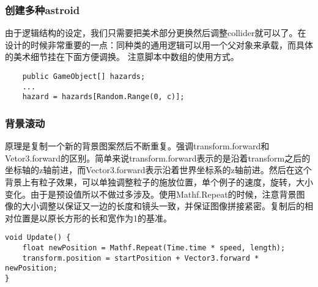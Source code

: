 \documentclass[10pt, a4paper]{article}
\begin{document}
        \subsubsection{创建多种astroid}
            由于逻辑结构的设定，我们只需要把美术部分更换然后调整collider就可以了。在设计的时候非常重要的一点：同种类的通用逻辑可以用一个父对象来承载，而具体的美术细节挂在下面方便调换。 注意脚本中数组的使用方式。 
\begin{lstlisting}
    public GameObject[] hazards; 
    ...
    hazard = hazards[Random.Range(0, c)]; 
\end{lstlisting}
        \subsubsection{背景滚动}
            原理是复制一个新的背景图案然后不断重复。强调transform.forward和Vetor3.forward的区别。简单来说transform.forward表示的是沿着transform之后的坐标轴的z轴前进，而Vector3.forward表示沿着世界坐标系的z轴前进。然后在这个背景上有粒子效果，可以单独调整粒子的施放位置，单个例子的速度，旋转，大小变化。由于是预设值所以不做过多涉及。使用Mathf.Repeat的时候，注意背景图像的大小调整以保证又一边的长度和镜头一致，并保证图像拼接紧密。复制后的相对位置是以原长方形的长和宽作为1的基准。 
\begin{lstlisting}
void Update() {
    float newPosition = Mathf.Repeat(Time.time * speed, length);
    transform.position = startPosition + Vector3.forward * newPosition; 
}
\end{lstlisting}
\end{document}
